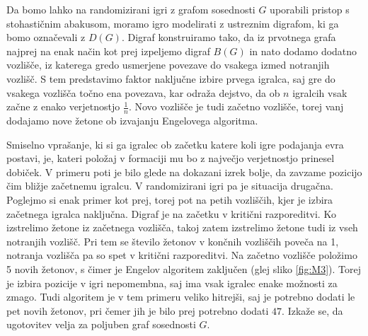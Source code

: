 \documentclass[twoside,11pt]{article}
\begin{document}
Da bomo lahko na randomizirani igri z grafom sosednosti $G$ uporabili pristop s stohastičnim abakusom, moramo igro modelirati z ustreznim digrafom, ki ga bomo označevali z $D(G)$.
Digraf konstruiramo tako, da iz prvotnega grafa najprej na enak način kot prej izpeljemo digraf $B(G)$ in nato dodamo dodatno vozlišče, iz katerega gredo usmerjene povezave do vsakega izmed notranjih vozlišč. 
S tem predstavimo faktor naključne izbire prvega igralca, saj gre do vsakega vozlišča točno ena povezava, kar odraža dejstvo, da ob $n$ 
igralcih vsak začne z enako verjetnostjo $\frac{1}{n}$. Novo vozlišče je tudi začetno vozlišče, torej vanj dodajamo nove žetone ob izvajanju Engelovega algoritma.

Smiselno vprašanje, ki si ga igralec ob začetku katere koli igre podajanja evra postavi, je, kateri položaj v formaciji mu bo z največjo verjetnostjo prinesel dobiček. V primeru poti je bilo glede na dokazani izrek bolje, da zavzame pozicijo čim bližje začetnemu igralcu.
V randomizirani igri pa je situacija drugačna. Poglejmo si enak primer kot prej, torej pot na petih vozliščih, kjer je izbira začetnega igralca naključna. Digraf je na začetku v kritični razporeditvi.
Ko izstrelimo žetone iz začetnega vozlišča, takoj zatem izstrelimo žetone tudi iz vseh notranjih vozlišč. Pri tem se število žetonov v končnih vozliščih poveča na 1, notranja vozlišča pa so spet v kritični razporeditvi. Na začetno vozlišče položimo 5 novih žetonov, s čimer je Engelov algoritem zaključen (glej sliko \ref{fig:M3}).
Torej je izbira pozicije v igri nepomembna, saj ima vsak igralec enake možnosti za zmago. Tudi algoritem je v tem primeru veliko hitrejši, saj je potrebno dodati le pet novih žetonov, pri čemer jih je bilo prej potrebno dodati $47$. Izkaže se, da ugotovitev velja za poljuben graf sosednosti $G$.
\end{document}
